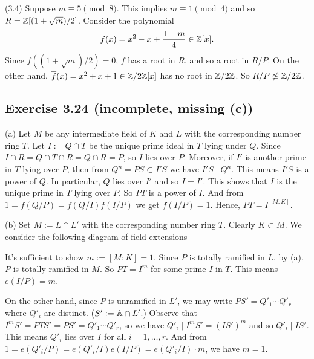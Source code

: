 \documentclass[../Marcus.tex]{subfiles}
\begin{document}
(3.4) Suppose $m\equiv 5\pmod{8}$. This implies $m\equiv 1\pmod{4}$ and so $R=\ZZ[{(1+\sqrt{m})/2}]$. Consider the polynomial 
$$
f(x)=x^2-x+\frac{1-m}{4}\in\ZZ[x].
$$ 
Since $f((1+\sqrt{m})/2)=0$, $f$ has a root in $R$, and so a root in $R/P$. On the other hand, $\ovl{f}(x)=x^2+x+1\in\ZZ/2\ZZ[x]$ has no root in $\ZZ/2\ZZ$. So $R/P\not\simeq\ZZ/2\ZZ$.

\subsection*{Exercise 3.24 \color{red}(incomplete, missing (c))}

(a) Let $M$ be any intermediate field of $K$ and $L$ with the corresponding number ring $T$. Let $I:=Q\cap T$ be the unique prime ideal in $T$ lying under $Q$. Since $I\cap R=Q\cap T\cap R=Q\cap R=P$, so $I$ lies over $P$. Moreover, if $I'$ is another prime in $T$ lying over $P$, then from $Q^n=PS\subset I'S$ we have $I'S\mid Q^n$. This means $I'S$ is a power of $Q$. In particular, $Q$ lies over $I'$ and so $I=I'$. This shows that $I$ is the unique prime in $T$ lying over $P$. So $PT$ is a power of $I$. And from $1=f(Q/P)=f(Q/I)f(I/P)$ we get $f(I/P)=1$. Hence, $PT=I^{[M:K]}$.

(b) Set $M:=L\cap L'$ with the corresponding number ring $T$. Clearly $K\subset M$. We consider the following diagram of field extensions
\begin{center}
\end{center}
It's sufficient to show $m:=[M:K]=1$. Since $P$ is totally ramified in $L$, by (a), $P$ is totally ramified in $M$. So $PT=I^m$ for some prime $I$ in $T$. This means $e(I/P)=m$.

On the other hand, since $P$ is unramified in $L'$, we may write $PS'=Q'_1\cdots Q'_r$ where $Q'_i$ are distinct. ($S':=\AA\cap L'$.) Observe that $I^mS'=PTS'=PS'=Q'_1\cdots Q'_r$, so we have $Q'_i \mid I^m S' = (IS')^m$ and so $Q'_i \mid IS'$. This means $Q'_i$ lies over $I$ for all $i=1,\ldots,r$. And from $1=e(Q'_i/P)=e(Q'_i/I)e(I/P)=e(Q'_i/I)\cdot m$, we have $m=1$.

\end{document}
